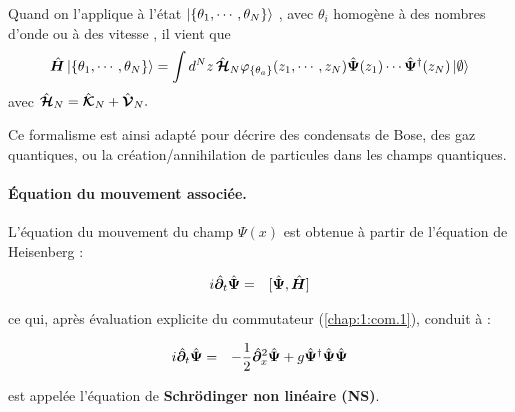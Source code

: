 Quand on l'applique à l'état $\ket{\{\theta_1 , \cdots , \theta_N \}} $, avec $\theta_i$ homogène à des nombres d'onde ou à des vitesse , il vient que %
\begin{eqnarray}
\hat{\bm{H}}\ket{\{\theta_1 , \cdots , \theta_N\}} =  \int d^Nz \, \hat{\bm{\mathcal{H}}}_N \varphi_{\{\theta_a\}}(z_1 , \cdots , z_N )\hat{\bm{\Psi}}(z_1)\cdots \hat{\bm{\Psi}}^\dag(z_N) \ket{\emptyset} 
\end{eqnarray}
avec 
\(
	\hat{\bm{\mathcal{H}}}_N 	
 =  \hat{\bm{\mathcal{K}}}_N  +  \hat{\bm{\mathcal{V}}}_N .	
\)



Ce formalisme est ainsi adapté pour décrire des condensats de Bose, des gaz quantiques, ou la création/annihilation de particules dans les champs quantiques.

\paragraph{Équation du mouvement associée.}

L’équation du mouvement du champ \( \Psi(x) \) est obtenue à partir de l’équation de Heisenberg :

\begin{eqnarray}
	i\hat{\bm{\partial}}_t	\hat{\bm{\Psi}} & = & [ \hat{\bm{\Psi}} , \hat{\bm{H}} ]
\end{eqnarray}

ce qui, après évaluation explicite du commutateur (\ref{chap:1:com.1}), conduit à :



\begin{eqnarray}
	i \hat{\bm{\partial}}_t \hat{\bm{\Psi}}	 & = & - \frac{1}{2}\hat{\bm{\partial}}_x^2 \hat{\bm{\Psi}} + g \hat{\bm{\Psi}}^\dag\hat{\bm{\Psi}} \hat{\bm{\Psi}}
\end{eqnarray}

est appelée l'équation de \textbf{Schrödinger non linéaire (NS)}.

